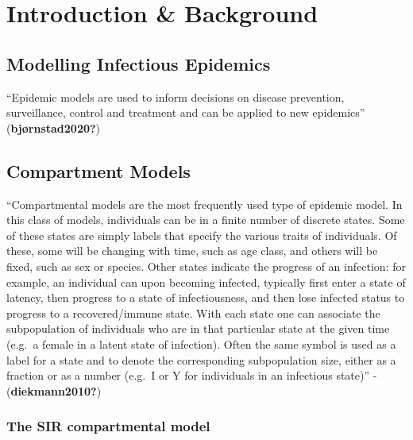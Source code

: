 \documentclass{monashthesis}
\begin{document}
\clearpage{}\setcounter{page}{0}


\hypertarget{sec-intro}{%
\chapter{Introduction \& Background}\label{sec-intro}}

\hypertarget{modelling-infectious-epidemics}{%
\section{Modelling Infectious
Epidemics}\label{modelling-infectious-epidemics}}

``Epidemic models are used to inform decisions on disease prevention,
surveillance, control and treatment and can be applied to new
epidemics'' (\textbf{bjørnstad2020?})

\hypertarget{compartment-models}{%
\section{Compartment Models}\label{compartment-models}}

``Compartmental models are the most frequently used type of epidemic
model. In this class of models, individuals can be in a finite number of
discrete states. Some of these states are simply labels that specify the
various traits of individuals. Of these, some will be changing with
time, such as age class, and others will be fixed, such as sex or
species. Other states indicate the progress of an infection: for
example, an individual can upon becoming infected, typically first enter
a state of latency, then progress to a state of infectiousness, and then
lose infected status to progress to a recovered/immune state. With each
state one can associate the subpopulation of individuals who are in that
particular state at the given time (e.g.~a female in a latent state of
infection). Often the same symbol is used as a label for a state and to
denote the corresponding subpopulation size, either as a fraction or as
a number (e.g.~I or Y for individuals in an infectious state)'' -
(\textbf{diekmann2010?})

\hypertarget{the-sir-compartmental-model}{%
\subsection{The SIR compartmental
model}\label{the-sir-compartmental-model}}
\end{document}
